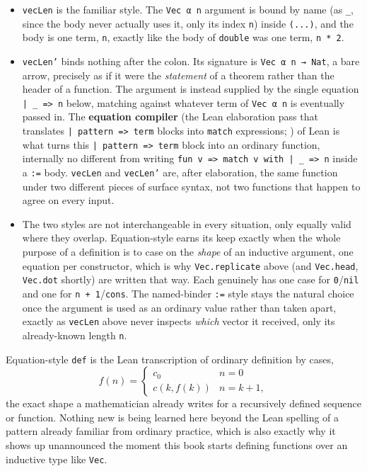 \begin{itemize}
\tightlist
\item
  \texttt{vecLen} is the familiar style. The \texttt{Vec α n} argument is bound by name (as \texttt{\_\allowbreak{}}, since the body never actually uses it, only its index \texttt{n}) inside \texttt{(...)}, and the body is one term, \texttt{n}, exactly like the body of \texttt{double} was one term, \texttt{n * 2}.
\item
  \texttt{vecLen'} binds nothing after the colon. Its signature is \texttt{Vec α n → Nat}, a bare arrow, precisely as if it were the \emph{statement} of a theorem rather than the header of a function. The argument is instead supplied by the single equation \texttt{| \_\allowbreak{} => n} below, matching against whatever term of \texttt{Vec α n} is eventually passed in. The \textbf{equation compiler} (the Lean elaboration pass that translates \texttt{| pattern => term} blocks into \texttt{match} expressions; \cite{LeanDocs}) of Lean is what turns this \texttt{| pattern => term} block into an ordinary function, internally no different from writing \texttt{fun v => match v with | \_\allowbreak{} => n} inside a \texttt{:=} body. \texttt{vecLen} and \texttt{vecLen'} are, after elaboration, the same function under two different pieces of surface syntax, not two functions that happen to agree on every input.
\item
  The two styles are not interchangeable in every situation, only equally valid where they overlap. Equation-style earns its keep exactly when the whole purpose of a definition is to case on the \emph{shape} of an inductive argument, one equation per constructor, which is why \texttt{Vec.replicate} above (and \texttt{Vec.head}, \texttt{Vec.dot} shortly) are written that way. Each genuinely has one case for \texttt{0}/\texttt{nil} and one for \texttt{n + 1}/\texttt{cons}. The named-binder \texttt{:=} style stays the natural choice once the argument is used as an ordinary value rather than taken apart, exactly as \texttt{vecLen} above never inspects \emph{which} vector it received, only its already-known length \texttt{n}.
\end{itemize}

\begin{mathreading}

Equation-style \texttt{def} is the Lean transcription of ordinary definition by cases, \[
f(n) = \begin{cases} c_0 & n = 0 \\ c(k, f(k)) & n = k + 1, \end{cases}
\] the exact shape a mathematician already writes for a recursively defined sequence or function. Nothing new is being learned here beyond the Lean spelling of a pattern already familiar from ordinary practice, which is also exactly why it shows up unannounced the moment this book starts defining functions over an inductive type like \texttt{Vec}.

\end{mathreading}

